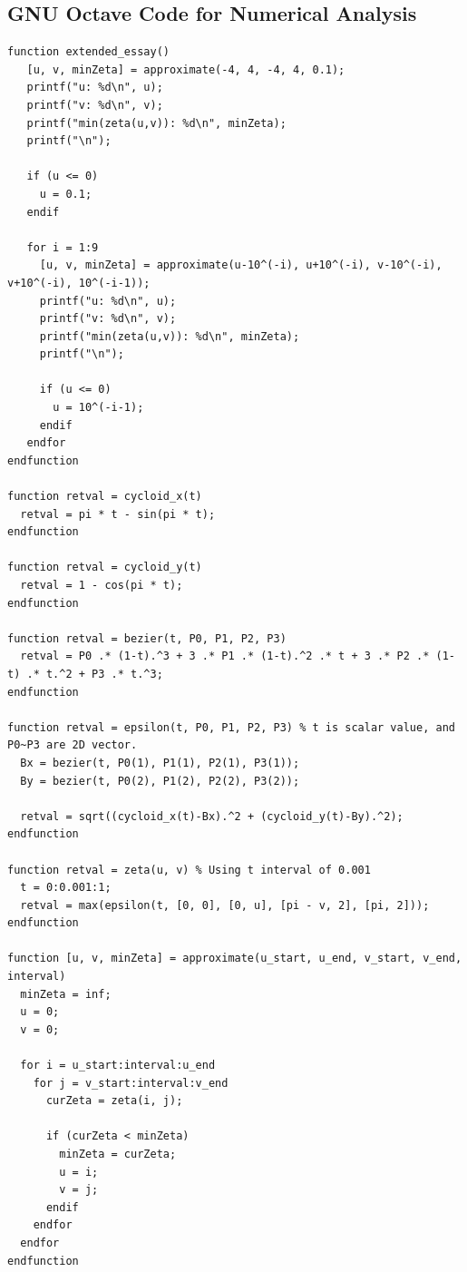 \documentclass[12pt, oneside, appendixprefix=Appendix]{article}
\theoremstyle{definition}
\numberwithin{figure}{section}
\begin{document}
\begin{appendices}
\section{GNU Octave Code for Numerical Analysis}

\begin{scriptsize}\begin{verbatim}
function extended_essay()
   [u, v, minZeta] = approximate(-4, 4, -4, 4, 0.1);
   printf("u: %d\n", u);
   printf("v: %d\n", v);
   printf("min(zeta(u,v)): %d\n", minZeta);
   printf("\n");
   
   if (u <= 0)
     u = 0.1;
   endif
   
   for i = 1:9
     [u, v, minZeta] = approximate(u-10^(-i), u+10^(-i), v-10^(-i), v+10^(-i), 10^(-i-1));
     printf("u: %d\n", u);
     printf("v: %d\n", v);
     printf("min(zeta(u,v)): %d\n", minZeta);
     printf("\n");
     
     if (u <= 0)
       u = 10^(-i-1);
     endif
   endfor
endfunction

function retval = cycloid_x(t)
  retval = pi * t - sin(pi * t);
endfunction

function retval = cycloid_y(t)
  retval = 1 - cos(pi * t);
endfunction

function retval = bezier(t, P0, P1, P2, P3)
  retval = P0 .* (1-t).^3 + 3 .* P1 .* (1-t).^2 .* t + 3 .* P2 .* (1-t) .* t.^2 + P3 .* t.^3;
endfunction

function retval = epsilon(t, P0, P1, P2, P3) % t is scalar value, and P0~P3 are 2D vector.
  Bx = bezier(t, P0(1), P1(1), P2(1), P3(1));
  By = bezier(t, P0(2), P1(2), P2(2), P3(2));
  
  retval = sqrt((cycloid_x(t)-Bx).^2 + (cycloid_y(t)-By).^2);
endfunction

function retval = zeta(u, v) % Using t interval of 0.001
  t = 0:0.001:1;
  retval = max(epsilon(t, [0, 0], [0, u], [pi - v, 2], [pi, 2]));
endfunction

function [u, v, minZeta] = approximate(u_start, u_end, v_start, v_end, interval)
  minZeta = inf;
  u = 0;
  v = 0;
  
  for i = u_start:interval:u_end
    for j = v_start:interval:v_end
      curZeta = zeta(i, j);
      
      if (curZeta < minZeta)
        minZeta = curZeta;
        u = i;
        v = j;
      endif
    endfor
  endfor
endfunction
\end{verbatim}
\end{scriptsize}

\end{appendices}
\end{document}
